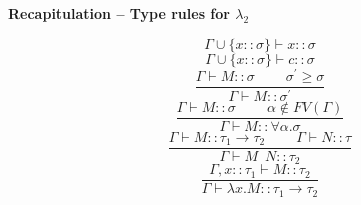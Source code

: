 \documentclass{beamer}
\begin{document}
\begin{frame}[fragile]{\bf Recapitulation – Type rules for $\lambda_2$}

\begin{equation}
    \Gamma \cup \{x :: \sigma \} \vdash x :: \sigma \tag{\sc Var}
\end{equation}  
\vspace{-5pt}
\begin{equation}
    \Gamma \cup \{x :: \sigma \} \vdash c :: \sigma \tag{\sc Con}
\end{equation}
\vspace{0pt}
\begin{equation}
    \frac{\Gamma \vdash M :: \sigma \; \; \; \; \; \; \; \; \sigma^\prime \ge \sigma}
    {\Gamma \vdash M :: \sigma^\prime} \tag{\sc Inst}
\end{equation}
\vspace{5pt}
\begin{equation}
    \frac{\Gamma \vdash M :: \sigma \; \; \; \; \; \; \; \; \alpha \notin FV(\Gamma)}
    {\Gamma \vdash M :: \forall \alpha.\sigma} \tag{\sc Gen}
\end{equation}
\vspace{5pt}
\begin{equation}
    \frac{\Gamma \vdash M :: \tau_1 \rightarrow \tau_2 \; \; \; \; \; \; \; \; \Gamma \vdash N :: \tau}
    {\Gamma \vdash M \; \:  N :: \tau_2} \tag{\sc M-App}
\end{equation}
\vspace{5pt}
\begin{equation}
    \frac{\Gamma,x :: \tau_1 \vdash M :: \tau_2}
    {\Gamma \vdash \lambda x.M :: \tau_1 \rightarrow \tau_2} \tag{\sc M-Abs}
\end{equation}
   
\end{frame}
\end{document}
